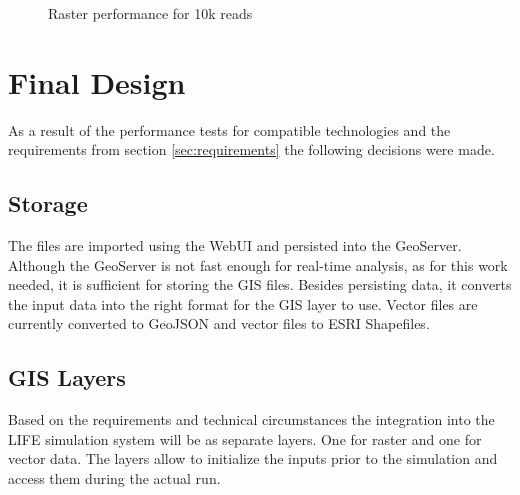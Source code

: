\begin{figure}[H]
	\caption{Raster performance for 10k reads}
	\label{fig:raster_performace_best}
\end{figure}


\section{Final Design}
As a result of the performance tests for compatible technologies and the requirements from section \ref{sec:requirements} the following decisions were made.


\subsection{Storage}
The files are imported using the WebUI and persisted into the GeoServer. Although the GeoServer is not fast enough for real-time analysis, as for this work needed, it is sufficient for storing the GIS files. Besides persisting data, it converts the input data into the right format for the GIS layer to use. Vector files are currently converted to GeoJSON and vector files to ESRI Shapefiles.


\subsection{GIS Layers}
Based on the requirements and technical circumstances the integration into the LIFE simulation system will be as separate layers. One for raster and one for vector data. The layers allow to initialize the inputs prior to the simulation and access them during the actual run.

